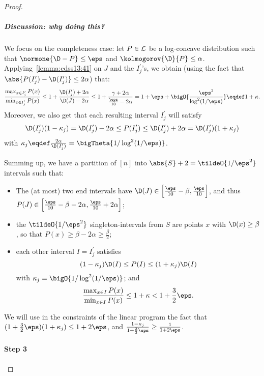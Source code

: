 \begin{proof}
\subparagraph{Discussion: why doing this?}\label{ssec:logconcave:completeness}
We focus on the completeness case: let $P\in\mathcal{L}$ be a log-concave distribution such that $\normone{\D-P} \leq \eps$ and $\kolmogorov{\D}{P} \leq \alpha$.
Applying~\cref{lemma:cdss13:41} on $J$ and the $I^\prime_j$'s, we obtain (using the fact that $\abs{P(I^\prime_j) - \D(I^\prime_j)} \leq 2\alpha$) that:
\[
    \frac{\max_{x\in I^\prime_j} P(x)}{\min_{x\in I^\prime_j} P(x)} 
    \leq 1+\frac{\D(I^\prime_j)+2\alpha}{\D(J)-2\alpha} 
    \leq 1 + \frac{\gamma+2\alpha}{\frac{\eps}{10}-2\alpha}
    = 1+ \eps + \bigO{\frac{\eps^2}{\log^2(1/\eps)}} \eqdef 1+\kappa.
\]
Moreover, we also get that each resulting interval $I^\prime_j$ will satisfy
\[
      \D(I^\prime_j)(1-\kappa_j) = \D(I^\prime_j)-2\alpha \leq P(I^\prime_j) \leq \D(I^\prime_j)+2\alpha = \D(I^\prime_j)(1+\kappa_j)
\]
with $\kappa_j \eqdef \frac{2\alpha}{\D(I^\prime_j)} = \bigTheta{1/\log^2(1/\eps)}$.\medskip

Summing up, we have a partition of $[n]$ into $\abs{S}+2 = \tildeO{1/\eps^2}$ intervals such that:
\begin{itemize}
  \item The (at most) two end intervals have $\D(J)\in\left[\frac{\eps}{10}-\beta, \frac{\eps}{10}\right]$, and thus $P(J)\in\left[\frac{\eps}{10}-\beta-2\alpha, \frac{\eps}{10}+2\alpha\right]$;
  \item the $\tildeO{1/\eps^2}$ singleton-intervals from $S$ are points $x$ with $\D(x) \geq \beta$, so that $P(x) \geq \beta -2\alpha \geq \frac{\beta}{2}$;
  \item each other interval $I=I^\prime_j$ satisfies 
  \begin{equation}\label{eq:logconcave:completeness:1}
    (1-\kappa_j) \D(I) \leq P(I) \leq (1+\kappa_j) \D(I)
  \end{equation}
  with $\kappa_j=\bigO{1/\log^2(1/\eps)}$; and
  \begin{equation}\label{eq:logconcave:completeness:2}
  \frac{\max_{x\in I}P(x)}{\min_{x\in I}P(x)} \leq 1+\kappa < 1+\frac{3}{2}\eps.
  \end{equation}
\end{itemize}
We will use in the constraints of the linear program the fact that $(1+\frac{3}{2}\eps)(1+\kappa_j) \leq 1+2\eps$, and $\frac{1-\kappa_j}{1+\frac{3}{2}\eps} \geq \frac{1}{1+2\eps}$.

\paragraph{Step 3}\label{stage:3}


\end{proof}
